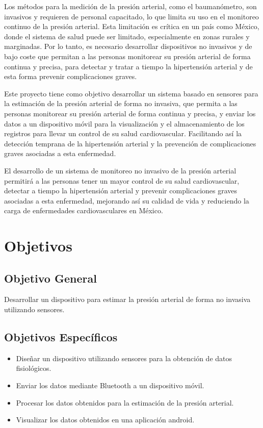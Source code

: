 Los métodos para la medición de la presión arterial, como el baumanómetro, son invasivos y requieren de personal capacitado, lo que limita su uso en el monitoreo continuo de la presión arterial. Esta limitación es crítica en un país como México, donde el sistema de salud puede ser limitado, especialmente en zonas rurales y marginadas. Por lo tanto, es necesario desarrollar dispositivos no invasivos y de bajo coste que permitan a las personas monitorear su presión arterial de forma continua y precisa, para detectar y tratar a tiempo la hipertensión arterial y de esta forma prevenir complicaciones graves.

Este proyecto tiene como objetivo desarrollar un sistema basado en sensores para la estimación de la presión arterial de forma no invasiva, que permita a las personas monitorear su presión arterial de forma continua y precisa, y enviar los datos a un dispositivo móvil para la visualización y el almacenamiento de los registros para llevar un control de su salud cardiovascular. Facilitando así la detección temprana de la hipertensión arterial y la prevención de complicaciones graves asociadas a esta enfermedad.

El desarrollo de un sistema de monitoreo no invasivo de la presión arterial permitirá a las personas tener un mayor control de su salud cardiovascular, detectar a tiempo la hipertensión arterial y prevenir complicaciones graves asociadas a esta enfermedad, mejorando así su calidad de vida y reduciendo la carga de enfermedades cardiovasculares en México.


\newpage
\section{Objetivos}
    \subsection{Objetivo General}
    Desarrollar un dispositivo para estimar la presión arterial de forma no invasiva utilizando sensores.
    \subsection{Objetivos Específicos}
    \begin{itemize}
        \item Diseñar un dispositivo utilizando sensores para la obtención de datos fisiológicos.
        \item Enviar los datos mediante Bluetooth a un dispositivo móvil.
        \item Procesar los datos obtenidos para la estimación de la presión arterial.
        \item Visualizar los datos obtenidos en una aplicación android.
    \end{itemize}

